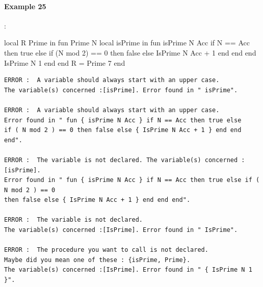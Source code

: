 \documentclass[11pt,a4paper,twoside,openright]{report}
\begin{document}
%
%

\paragraph{Example 25}:

\begin{OZ}
local R Prime in
	fun {Prime N}
		local isPrime in
		    fun {isPrime N Acc}
        			if N == Acc then true
		        else  if (N mod 2) == 0 then false
			            else {IsPrime N Acc + 1 }
			            end
        			end
    			end    
		{IsPrime N 1}
		end	
	end
R = {Prime 7}
end
\end{OZ}

\begin{lstlisting}
ERROR :  A variable should always start with an upper case. 
The variable(s) concerned :[isPrime]. Error found in " isPrime".

ERROR :  A variable should always start with an upper case. 
Error found in " fun { isPrime N Acc } if N == Acc then true else 
if ( N mod 2 ) == 0 then false else { IsPrime N Acc + 1 } end end end".

ERROR :  The variable is not declared. The variable(s) concerned :[isPrime]. 
Error found in " fun { isPrime N Acc } if N == Acc then true else if ( N mod 2 ) == 0 
then false else { IsPrime N Acc + 1 } end end end".

ERROR :  The variable is not declared. 
The variable(s) concerned :[IsPrime]. Error found in " IsPrime".

ERROR :  The procedure you want to call is not declared. 
Maybe did you mean one of these : {isPrime, Prime}. 
The variable(s) concerned :[IsPrime]. Error found in " { IsPrime N 1 }".

\end{lstlisting}
\end{document}
